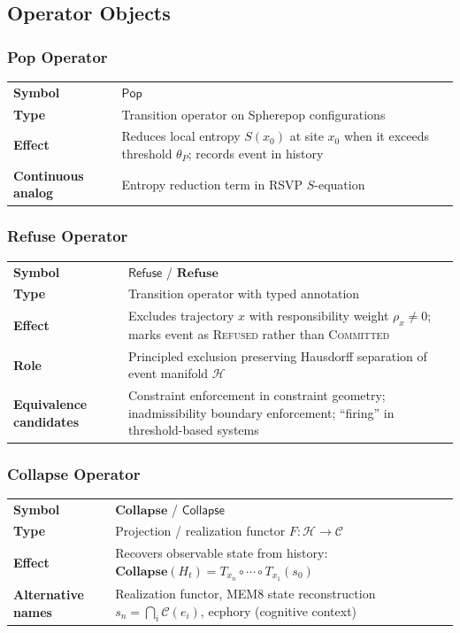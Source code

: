 \documentclass[11pt, a4paper]{article}
\begin{document}
\subsection{Operator Objects}

\subsubsection{Pop Operator}

\begin{longtable}{lp{10cm}}
\textbf{Symbol} & $\mathsf{Pop}$ \\
\textbf{Type} & Transition operator on Spherepop configurations \\
\textbf{Effect} & Reduces local entropy $S(x_0)$ at site $x_0$ when it
  exceeds threshold $\theta_P$; records event in history \\
\textbf{Continuous analog} & Entropy reduction term in RSVP $S$-equation \\
\end{longtable}

\subsubsection{Refuse Operator}

\begin{longtable}{lp{10cm}}
\textbf{Symbol} & $\mathsf{Refuse}$ / $\mathbf{Refuse}$ \\
\textbf{Type} & Transition operator with typed annotation \\
\textbf{Effect} & Excludes trajectory $x$ with responsibility weight
  $\rho_x \neq 0$; marks event as \textsc{Refused} rather than
  \textsc{Committed} \\
\textbf{Role} & Principled exclusion preserving Hausdorff separation
  of event manifold $\mathcal{H}$ \\
\textbf{Equivalence candidates} & Constraint enforcement in constraint
  geometry; inadmissibility boundary enforcement; ``firing'' in
  threshold-based systems \\
\end{longtable}

\subsubsection{Collapse Operator}

\begin{longtable}{lp{10cm}}
\textbf{Symbol} & $\mathbf{Collapse}$ / $\mathsf{Collapse}$ \\
\textbf{Type} & Projection / realization functor $F: \mathcal{H} \to
  \mathcal{C}$ \\
\textbf{Effect} & Recovers observable state from history:
  $\mathbf{Collapse}(H_t) = T_{x_n} \circ \cdots \circ T_{x_1}(s_0)$ \\
\textbf{Alternative names} & Realization functor, MEM\textbar{}8 state
  reconstruction $s_n = \bigcap_i \mathcal{C}(e_i)$, ecphory (cognitive
  context) \\
\end{longtable}
\end{document}
